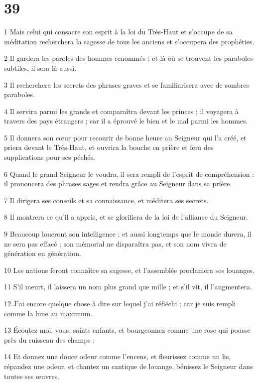 \chapter{39}

\par 1 Mais celui qui consacre son esprit à la loi du Très-Haut et s'occupe de sa méditation recherchera la sagesse de tous les anciens et s'occupera des prophéties.
\par 2 Il gardera les paroles des hommes renommés ; et là où se trouvent les paraboles subtiles, il sera là aussi.
\par 3 Il recherchera les secrets des phrases graves et se familiarisera avec de sombres paraboles.
\par 4 Il servira parmi les grands et comparaîtra devant les princes ; il voyagera à travers des pays étrangers ; car il a éprouvé le bien et le mal parmi les hommes.
\par 5 Il donnera son cœur pour recourir de bonne heure au Seigneur qui l'a créé, et priera devant le Très-Haut, et ouvrira la bouche en prière et fera des supplications pour ses péchés.
\par 6 Quand le grand Seigneur le voudra, il sera rempli de l'esprit de compréhension : il prononcera des phrases sages et rendra grâce au Seigneur dans sa prière.
\par 7 Il dirigera ses conseils et sa connaissance, et méditera ses secrets.
\par 8 Il montrera ce qu'il a appris, et se glorifiera de la loi de l'alliance du Seigneur.
\par 9 Beaucoup loueront son intelligence ; et aussi longtemps que le monde durera, il ne sera pas effacé ; son mémorial ne disparaîtra pas, et son nom vivra de génération en génération.
\par 10 Les nations feront connaître sa sagesse, et l'assemblée proclamera ses louanges.
\par 11 S'il meurt, il laissera un nom plus grand que mille ; et s'il vit, il l'augmentera.
\par 12 J'ai encore quelque chose à dire sur lequel j'ai réfléchi ; car je suis rempli comme la lune au maximum.
\par 13 Écoutez-moi, vous, saints enfants, et bourgeonnez comme une rose qui pousse près du ruisseau des champs :
\par 14 Et donnez une douce odeur comme l'encens, et fleurissez comme un lis, répandez une odeur, et chantez un cantique de louange, bénissez le Seigneur dans toutes ses œuvres.
